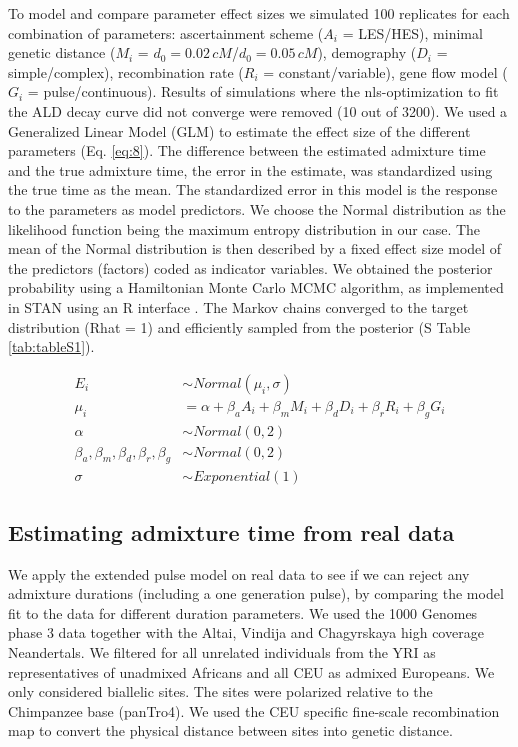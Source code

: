 \documentclass[]{article}
\begin{document}
To model and compare parameter effect sizes we simulated 100
replicates for each combination of
parameters: ascertainment scheme ($A_i$ = LES/HES), minimal genetic distance
($M_i$ = \(d_{0}=0.02\,cM\)/\(d_{0}=0.05\,cM\)), demography ($D_i$ = simple/complex),
recombination rate ($R_i$ = constant/variable), gene flow model
($G_i$ = pulse/continuous). Results of simulations where the nls-optimization to
fit the ALD decay curve did not converge were removed (10 out of 3200).
We used a Generalized Linear Model (GLM)  to estimate the effect
size of the different parameters (Eq.
\ref{eq:8}). The difference between the estimated
admixture time and the true admixture time, the error in the estimate,
was standardized using the true time as the mean. The standardized error in this model is the response to the parameters as model
predictors. We choose the Normal distribution as the likelihood function being the maximum entropy distribution in our case. The mean of the Normal distribution is then described by a fixed effect size model of the predictors (factors) coded as indicator variables. We obtained the posterior probability using a Hamiltonian Monte Carlo MCMC algorithm, as implemented in STAN \citep{carpenter_stan_2017} using an R interface \citep{stan_development_team_rstan_2018,mcelreath_statistical_2020}. The Markov chains converged to the target distribution (Rhat = 1) and efficiently sampled from the posterior (S Table \ref{tab:tableS1}).  

\begin{equation}\label{eq:8}
\begin{split}
E_i &\sim Normal(\mu_i,\sigma) \\
\mu_i &= \alpha + \beta_aA_i + \beta_mM_i + \beta_dD_i + \beta_rR_i + \beta_gG_i \\
\alpha &\sim Normal(0,2) \\
\beta_a,\beta_m,\beta_d,\beta_r,\beta_g &\sim Normal(0,2) \\
\sigma &\sim Exponential(1)
\end{split}
\end{equation}

\subsection{Estimating admixture time from real data}\label{Estimating admixture time from real data}

We apply the extended pulse model on real data to see if we can reject any admixture durations (including a one generation pulse), by comparing the model fit to the data for different duration parameters.
We used the 1000 Genomes phase 3 data together with the Altai, Vindija and Chagyrskaya high coverage Neandertals.  We filtered for all unrelated individuals from the YRI as representatives of unadmixed Africans and all CEU as admixed Europeans. We only considered biallelic sites. The sites were polarized relative to the Chimpanzee base (panTro4). We used the CEU specific fine-scale recombination map \citep{spence_inference_2019} to convert the physical distance between sites into genetic distance. 
\end{document}
